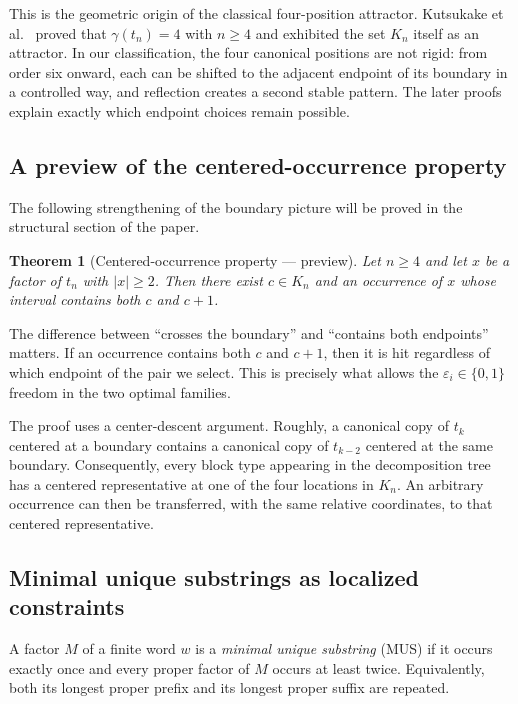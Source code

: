 \documentclass[10pt,a4paper]{article}
\newtheorem{theorem}{Theorem}[section]
\theoremstyle{definition}\newtheorem{definition}[theorem]{Definition}
\theoremstyle{remark}\newtheorem{remark}[theorem]{Remark}
\begin{document}
This is the geometric origin of the classical four-position attractor. Kutsukake et al.~\cite{Kutsukake2020} proved that
$
\gamma(t_n)=4$
with
$
n\ge4
$
and exhibited the set $K_n$ itself as an attractor. In our classification, the four canonical positions are not rigid: from order six onward, each can be shifted to the adjacent endpoint of its boundary in a controlled way, and reflection creates a second stable pattern. The later proofs explain exactly which endpoint choices remain possible.

\subsection{A preview of the centered-occurrence property}
The following strengthening of the boundary picture will be proved in the structural section of the paper.

\begin{theorem}[Centered-occurrence property --- preview]
\label{thm:centered-preview}
Let $n\ge4$ and let $x$ be a factor of $t_n$ with $|x|\ge2$. Then there exist $c\in K_n$ and an occurrence of $x$ whose interval contains both $c$ and $c+1$.
\end{theorem}

The difference between ``crosses the boundary'' and ``contains both endpoints'' matters. If an occurrence contains both $c$ and $c+1$, then it is hit regardless of which endpoint of the pair we select. This is precisely what allows the $\varepsilon_i\in\{0,1\}$ freedom in the two optimal families.

The proof uses a center-descent argument. Roughly, a canonical copy of $t_k$ centered at a boundary contains a canonical copy of $t_{k-2}$ centered at the same boundary. Consequently, every block type appearing in the decomposition tree has a centered representative at one of the four locations in $K_n$. An arbitrary occurrence can then be transferred, with the same relative coordinates, to that centered representative.

\subsection{Minimal unique substrings as localized constraints}
A factor $M$ of a finite word $w$ is a \emph{minimal unique substring} (MUS) if it occurs exactly once and every proper factor of $M$ occurs at least twice. Equivalently, both its longest proper prefix and its longest proper suffix are repeated.
\end{document}
